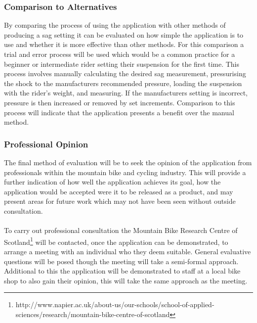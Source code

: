 	\subsubsection{Comparison to Alternatives}
		By comparing the process of using the application with other methods of producing a sag setting it can be evaluated on how simple the application is to use and whether it is more effective than other methods. For this comparison a trial and error process will be used which would be a common practice for a beginner or intermediate rider setting their suspension for the first time. This process involves manually calculating the desired sag measurement, pressurising the shock to the manufacturers recommended pressure, loading the suspension with the rider's weight, and measuring. If the manufacturers setting is incorrect, pressure is then increased or removed by set increments. Comparison to this process will indicate that the application presents a benefit over the manual method.
	\subsubsection{Professional Opinion}
		The final method of evaluation will be to seek the opinion of the application from professionals within the mountain bike and cycling industry. This will provide a further indication of how well the application achieves its goal, how the application would be accepted were it to be released as a product, and may present areas for future work which may not have been seen without outside consultation.
		\\\\
		To carry out professional consultation the Mountain Bike Research Centre of Scotland\footnote{http://www.napier.ac.uk/about-us/our-schools/school-of-applied-sciences/research/mountain-bike-centre-of-scotland} will be contacted, once the application can be demonstrated, to arrange a meeting with an individual who they deem suitable. General evaluative questions will be posed though the meeting will take a semi-formal approach. Additional to this the application will be demonstrated to staff at a local bike shop to also gain their opinion, this will take the same approach as the meeting.